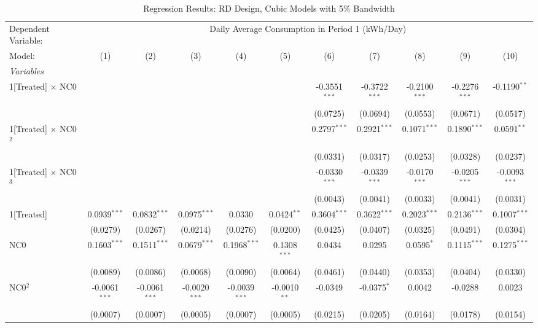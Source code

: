 \begin{table}[htbp]
\centering
\caption{\label{Table:Regression-Results_RD_Cubic_BW-5} Regression Results: RD Design, Cubic Models with 5\% Bandwidth}
\begin{tabular}{lcccccccccc}
\tabularnewline\toprule\toprule
Dependent Variable:&\multicolumn{10}{c}{Daily Average Consumption in Period 1 (kWh/Day)}\\
Model:&(1) & (2) & (3) & (4) & (5) & (6) & (7) & (8) & (9) & (10)\\
\midrule
\emph{Variables}&   &   &   &   &   &   &   &   &   &  \\
1[Treated] $\times $ NC0&   &    &    &    &    & -0.3551$^{***}$ & -0.3722$^{***}$ & -0.2100$^{***}$ & -0.2276$^{***}$ & -0.1190$^{**}$\\
  &   &    &    &    &    & (0.0725) & (0.0694) & (0.0553) & (0.0671) & (0.0517)\\
1[Treated] $\times $ NC0$^2$&   &    &    &    &    & 0.2797$^{***}$ & 0.2921$^{***}$ & 0.1071$^{***}$ & 0.1890$^{***}$ & 0.0591$^{**}$\\
  &   &    &    &    &    & (0.0331) & (0.0317) & (0.0253) & (0.0328) & (0.0237)\\
1[Treated] $\times $ NC0$^3$&   &    &    &    &    & -0.0330$^{***}$ & -0.0339$^{***}$ & -0.0170$^{***}$ & -0.0205$^{***}$ & -0.0093$^{***}$\\
  &   &    &    &    &    & (0.0043) & (0.0041) & (0.0033) & (0.0041) & (0.0031)\\
1[Treated]&0.0939$^{***}$ & 0.0832$^{***}$ & 0.0975$^{***}$ & 0.0330 & 0.0424$^{**}$ & 0.3604$^{***}$ & 0.3622$^{***}$ & 0.2023$^{***}$ & 0.2136$^{***}$ & 0.1007$^{***}$\\
  &(0.0279) & (0.0267) & (0.0214) & (0.0276) & (0.0200) & (0.0425) & (0.0407) & (0.0325) & (0.0491) & (0.0304)\\
NC0&0.1603$^{***}$ & 0.1511$^{***}$ & 0.0679$^{***}$ & 0.1968$^{***}$ & 0.1308$^{***}$ & 0.0434 & 0.0295 & 0.0595$^{*}$ & 0.1115$^{***}$ & 0.1275$^{***}$\\
  &(0.0089) & (0.0086) & (0.0068) & (0.0090) & (0.0064) & (0.0461) & (0.0440) & (0.0353) & (0.0404) & (0.0330)\\
NC0$^2$&-0.0061$^{***}$ & -0.0061$^{***}$ & -0.0020$^{***}$ & -0.0039$^{***}$ & -0.0010$^{**}$ & -0.0349 & -0.0375$^{*}$ & 0.0042 & -0.0288 & 0.0023\\
  &(0.0007) & (0.0007) & (0.0005) & (0.0007) & (0.0005) & (0.0215) & (0.0205) & (0.0164) & (0.0178) & (0.0154)\\

\end{tabular}
\end{table}
